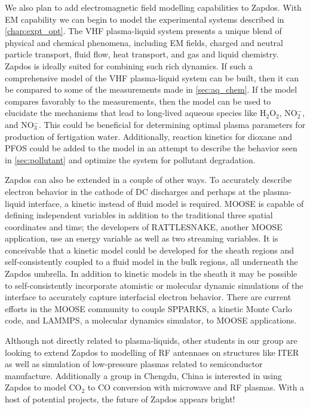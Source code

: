 We also plan to add electromagnetic field modelling capabilities to Zapdos. With EM capability we can begin to model the experimental systems described in \cref{chap:expt_opt}. The VHF plasma-liquid system presents a unique blend of physical and chemical phenomena, including EM fields, charged and neutral particle transport, fluid flow, heat transport, and gas and liquid chemistry. Zapdos is ideally suited for combining such rich dynamics. If such a comprehensive model of the VHF plasma-liquid system can be built, then it can be compared to some of the measurements made in \cref{sec:aq_chem}. If the model compares favorably to the measurements, then the model can be used to elucidate the mechanisms that lead to long-lived aqueous species like H$_2$O$_2$, NO$_2^-$, and NO$_3^-$. This could be beneficial for determining optimal plasma parameters for production of fertigation water. Additionally, reaction kinetics for dioxane and PFOS could be added to the model in an attempt to describe the behavior seen in \cref{sec:pollutant} and optimize the system for pollutant degradation.

Zapdos can also be extended in a couple of other ways. To accurately describe electron behavior in the cathode of DC discharges and perhaps at the plasma-liquid interface, a kinetic instead of fluid model is required. MOOSE is capable of defining independent variables in addition to the traditional three spatial coordinates and time; the developers of RATTLESNAKE, another MOOSE application, use an energy variable as well as two streaming variables. It is conceivable that a kinetic model could be developed for the sheath regions and self-consistently coupled to a fluid model in the bulk regions, all underneath the Zapdos umbrella. In addition to kinetic models in the sheath it may be possible to self-consistently incorporate atomistic or molecular dynamic simulations of the interface to accurately capture interfacial electron behavior. There are current efforts in the MOOSE community to couple SPPARKS, a kinetic Monte Carlo code, and LAMMPS, a molecular dynamics simulator, to MOOSE applications.

Although not directly related to plasma-liquids, other students in our group are looking to extend Zapdos to modelling of RF antennaes on structures like ITER as well as simulation of low-pressure plasmas related to semiconductor manufacture. Additionally a group in Chengdu, China is interested in using Zapdos to model CO$_2$ to CO conversion with microwave and RF plasmas. With a host of potential projects, the future of Zapdos appears bright!
